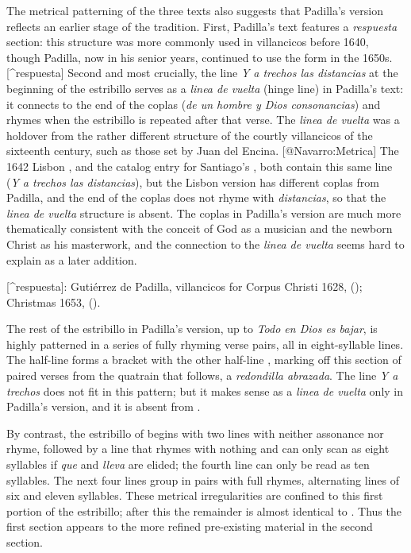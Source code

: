The metrical patterning of the three texts also suggests that Padilla's version
reflects an earlier stage of the tradition.
First, Padilla's text features a \emph{respuesta} section: this structure was more
commonly used in villancicos before 1640, though Padilla, now in his senior
years, continued to use the form in the 1650s.[^respuesta]
Second and most crucially, the line \emph{Y a trechos las distancias} at the
beginning of the estribillo serves as a \emph{linea de vuelta} (hinge line) in
Padilla's text: it connects to the end of the coplas (\emph{de un hombre y Dios
consonancias}) and rhymes when the estribillo is repeated after that verse.
The \emph{linea de vuelta} was a holdover from the rather different structure of the
courtly villancicos of the sixteenth century, such as those set by Juan del
Encina.
[@Navarro:Metrica] %
The 1642 Lisbon , and the catalog entry for Santiago's , both
contain this same line (\emph{Y a trechos las distancias}), but the Lisbon version
has different coplas from Padilla, and the end of the coplas does not rhyme with
\emph{distancias}, so that the \emph{linea de vuelta} structure is absent.
The  coplas in Padilla's version are much more thematically consistent with
the conceit of God as a musician and the newborn Christ as his masterwork, and
the connection to the \emph{linea de vuelta} seems hard to explain as a later
addition.

[^respuesta]:
Gutiérrez de Padilla, villancicos for Corpus Christi 1628, 
(); Christmas 1653, 
().

The rest of the estribillo in Padilla's version, up to \emph{Todo en Dios es bajar},
is highly patterned in a series of fully rhyming verse pairs, all in
eight-syllable lines.
The half-line  forms a bracket with the other half-line , marking off this section of paired verses from the quatrain that
follows, a \emph{redondilla abrazada}.
The line \emph{Y a trechos} does not fit in this pattern; but it makes sense as a
\emph{linea de vuelta} only in Padilla's version, and it is absent from .

By contrast, the estribillo of  begins with two lines with neither
assonance nor rhyme, followed by a line that rhymes with nothing and can only
scan as eight syllables if \emph{que} and \emph{lleva} are elided; the fourth line can
only be read as ten syllables.
The next four lines group in pairs with full rhymes, alternating lines of six
and eleven syllables.
These metrical irregularities are confined to this first portion of the
estribillo; after this the remainder is almost identical to .
Thus the first section appears  to the more refined pre-existing
material in the second section.

